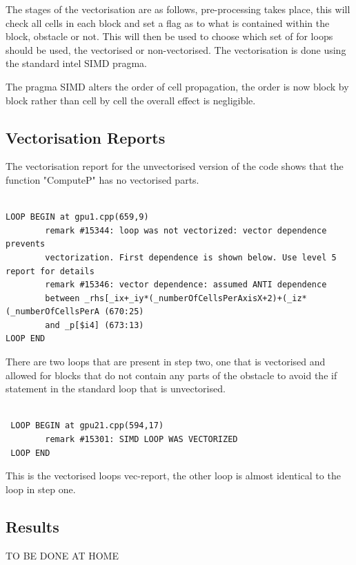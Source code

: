 \documentclass[paper=a4, fontsize=11pt]{scrartcl}
\numberwithin{equation}{section}		%
\numberwithin{figure}{section}			%
\numberwithin{table}{section}				%
\begin{document}
The stages of the vectorisation are as follows, pre-processing takes place, this will check all cells in each block and set a flag as to what is contained within the block, obstacle or not. This will then be used to choose which set of for loops should be used, the vectorised or non-vectorised. The vectorisation is done using the standard intel SIMD pragma.

The pragma SIMD alters the order of cell propagation, the order is now block by block rather than cell by cell the overall effect is negligible.

\subsection{Vectorisation Reports}

The vectorisation report for the unvectorised version of the code shows that the function "ComputeP" has no vectorised parts.
\begin{lstlisting}

LOOP BEGIN at gpu1.cpp(659,9)
        remark #15344: loop was not vectorized: vector dependence prevents 
        vectorization. First dependence is shown below. Use level 5 report for details
        remark #15346: vector dependence: assumed ANTI dependence 
        between _rhs[_ix+_iy*(_numberOfCellsPerAxisX+2)+(_iz*(_numberOfCellsPerA (670:25) 
        and _p[$i4] (673:13)
LOOP END

\end{lstlisting}

There are two loops that are present in step two, one that is vectorised and allowed for blocks that do not contain any parts of the obstacle to avoid the if statement in the standard loop that is unvectorised. 

\begin{lstlisting}

 LOOP BEGIN at gpu21.cpp(594,17)
		remark #15301: SIMD LOOP WAS VECTORIZED
 LOOP END

\end{lstlisting}

This is the vectorised loops vec-report, the other loop is almost identical to the loop in step one.

\subsection{Results}

TO BE DONE AT HOME

\end{document}
